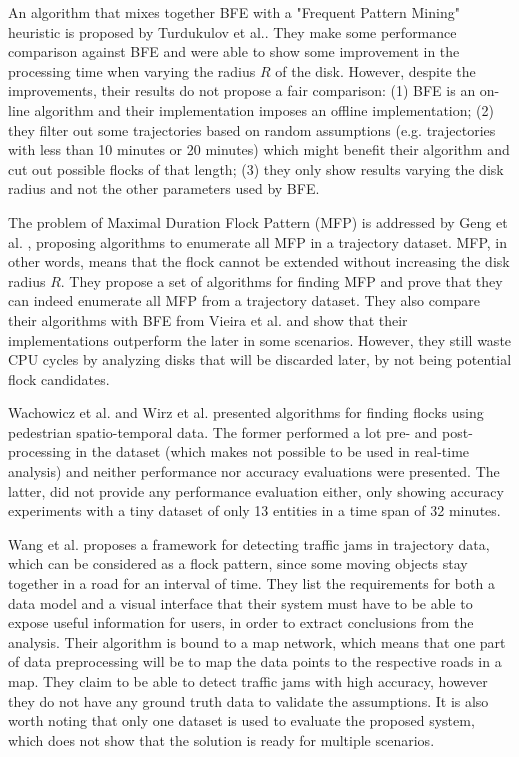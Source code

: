 An algorithm that mixes together BFE \citep{vieira} with a "Frequent Pattern Mining" heuristic is proposed by Turdukulov
et al.. They make some performance comparison against BFE and were able to show some improvement in the processing time
when varying the radius $R$ of the disk. However, despite the improvements, their results do not propose a fair
comparison: (1) BFE is an on-line algorithm and their implementation imposes an offline implementation; (2) they filter
out some trajectories based on random assumptions (e.g. trajectories with less than 10 minutes or 20 minutes) which
might benefit their algorithm and cut out possible flocks of that length; (3) they only show results varying the disk
radius and not the other parameters used by BFE.

The problem of Maximal Duration Flock Pattern (MFP) is addressed by Geng et al. \citep{enumeration}, proposing
algorithms to enumerate all MFP in a trajectory dataset. MFP, in other words, means that the flock cannot be extended
without increasing the disk radius $R$. They propose a set of algorithms for finding MFP and prove that they can indeed
enumerate all MFP from a trajectory dataset. They also compare their algorithms with BFE from Vieira et al.
\citep{vieira} and show that their implementations outperform the later in some scenarios. However, they still waste CPU
cycles by analyzing disks that will be discarded later, by not being potential flock candidates.

Wachowicz et al. and Wirz et al. \citep{flockpedestrian} \citep{pedestriancanyons} presented algorithms for finding
flocks using pedestrian spatio-temporal data. The former performed a lot pre- and post-processing in the dataset (which
makes not possible to be used in real-time analysis) and neither performance nor accuracy evaluations were presented.
The latter, did not provide any performance evaluation either, only showing accuracy experiments with a tiny dataset of
only 13 entities in a time span of 32 minutes.

Wang et al. \citep{visualtrafficjam} proposes a framework for detecting traffic jams in trajectory data, which can be
considered as a flock pattern, since some moving objects stay together in a road for an interval of time. They list the
requirements for both a data model and a visual interface that their system must have to be able to expose useful
information for users, in order to extract conclusions from the analysis. Their algorithm is bound to a map network,
which means that one part of data preprocessing will be to map the data points to the respective roads in a map. They
claim to be able to detect traffic jams with high accuracy, however they do not have any ground truth data to validate
the assumptions. It is also worth noting that only one dataset is used to evaluate the proposed system, which does not
show that the solution is ready for multiple scenarios.

